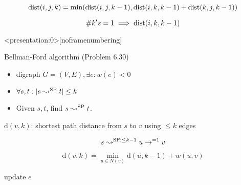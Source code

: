 
\begin{frame}{}
  \[
    \text{dist}(i,j,k) = \min(\text{dist}(i,j,k-1), \text{dist}(i,k,k-1) + \text{dist}(k,j,k-1))
  \]

  \[
    \# k's = 1 \implies \text{dist}(i,k,k-1)
  \]
\end{frame}

\begin{frame}<presentation:0>[noframenumbering]
  \begin{exampleblock}{Bellman-Ford algorithm (Problem 6.30)}
    \begin{itemize}
      \item digraph $G = (V, E), \exists e: w(e) < 0$
      \item $\forall s, t: |s \leadsto^{\text{SP}} t| \le k$
      \item Given $s,t$, find $s \leadsto^{\text{SP}} t$.
    \end{itemize}
  \end{exampleblock}

  $\text{d}(v,k)$: shortest path distance from $s$ to $v$ using $\le k$ edges

  \[
    s \leadsto^{\text{SP}; \le k-1} u \to^{=1} v
  \]

  \[
    \text{d}(v, k) = \min_{u \in N(v)} \text{d}(u, k-1) + w(u,v)
  \]

  \begin{center}
    \begin{minipage}{0.50\linewidth}
      \begin{algorithmic}[c]
		\State update $e$
	  \EndFor
	\EndFor
      \end{algorithmic}
    \end{minipage}
  \end{center}
\end{frame}

